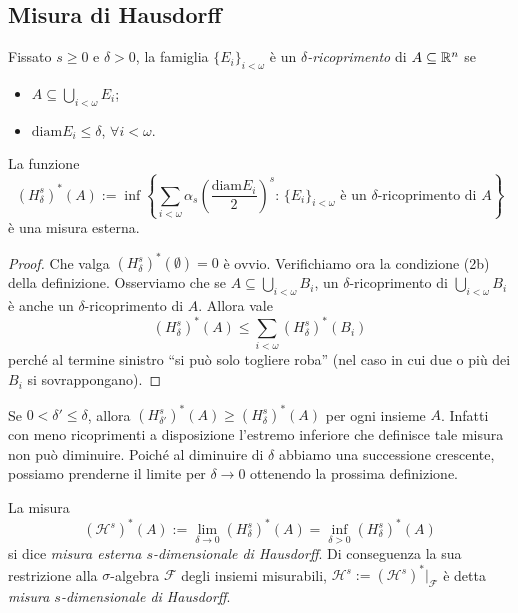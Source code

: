\subsection{Misura di Hausdorff}

\begin{definizione}
	Fissato $s\geq0$ e $\delta>0$, la famiglia $\{E_{i}\}_{i<\omega}$ è un \emph{$\delta$-ricoprimento} di $A\subseteq\mathbb{R}^{n}$ se 
	\begin{itemize}
		\item $A\subseteq\bigcup_{i<\omega}E_{i}$;
		\item $\text{diam} E_{i}\leq\delta$, $\forall i<\omega$.
	\end{itemize}
\end{definizione}

\begin{proposizione}
	La funzione 
	$$(H_{\delta}^{s})^{*}(A):=\inf\left\{ \sum_{i<\omega}\alpha_{s}\left(\frac{\text{diam}E_{i}}{2}\right)^{s}:\,\{E_{i}\}_{i<\omega}\text{ è un $\delta$-ricoprimento di }A\right\}$$
	è una misura esterna.
\end{proposizione}
\begin{proof}
	Che valga $(H_{\delta}^{s})^{*}(\emptyset)=0$ è ovvio. Verifichiamo ora la condizione (2b) della definizione. Osserviamo che se $A\subseteq\bigcup_{i<\omega}B_{i}$, un $\delta$-ricoprimento di $\bigcup_{i<\omega}B_{i}$ è anche un $\delta$-ricoprimento di $A$. Allora vale 
	$$(H_{\delta}^{s})^{*}(A)\leq\sum_{i<\omega}(H_{\delta}^{s})^{*}(B_{i})$$
	perché al termine sinistro ``si può solo togliere roba'' (nel caso in cui due o più dei $B_{i}$ si sovrappongano).
\end{proof}

\begin{osservazione}
	Se $0<\delta'\leq\delta$, allora $(H_{\delta'}^{s})^{*}(A)\geq (H_{\delta}^{s})^{*}(A)$ per ogni insieme $A$. Infatti con meno ricoprimenti a disposizione l'estremo inferiore che definisce tale misura non può diminuire. Poiché al diminuire di $\delta$ abbiamo una successione crescente, possiamo prenderne il limite per $\delta\to0$ ottenendo la prossima definizione.
\end{osservazione}

\begin{definizione}
	La misura
	$$(\mathcal H^{s})^{*}(A):=\lim_{\delta\to0}(H_{\delta}^{s})^{*}(A) = \inf_{\delta>0}(H_{\delta}^{s})^{*}(A)$$
	si dice \emph{misura esterna $s$-dimensionale di Hausdorff}. Di conseguenza la sua restrizione alla $\sigma$-algebra $\mathcal F$ degli insiemi misurabili, $\mathcal H^{s}:=(\mathcal H^{s})^{*}\big|_{\mathcal F}$ è detta \emph{misura $s$-dimensionale di Hausdorff}.
\end{definizione}

